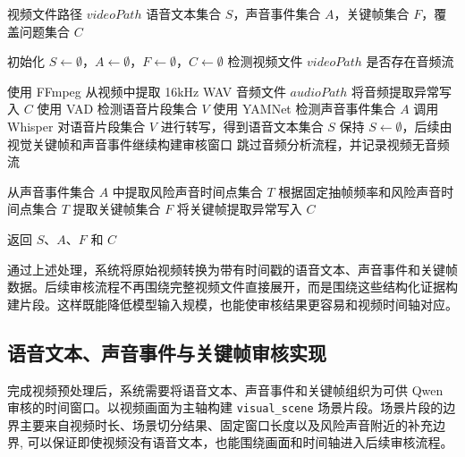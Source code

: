 \begin{algorithm}[!htbp]
    \caption{视频预处理与音频提取实现算法}
    \label{alg:video-preprocess-impl}
    \begin{algorithmic}[1]
        \Require 视频文件路径 $videoPath$
        \Ensure 语音文本集合 $S$，声音事件集合 $A$，关键帧集合 $F$，覆盖问题集合 $C$

        \State 初始化 $S \leftarrow \emptyset$，$A \leftarrow \emptyset$，$F \leftarrow \emptyset$，$C \leftarrow \emptyset$
        \State 检测视频文件 $videoPath$ 是否存在音频流

            \State 使用 FFmpeg 从视频中提取 16kHz WAV 音频文件 $audioPath$
                \State 将音频提取异常写入 $C$
            \Else
                \State 使用 VAD 检测语音片段集合 $V$
                \State 使用 YAMNet 检测声音事件集合 $A$
                    \State 调用 Whisper 对语音片段集合 $V$ 进行转写，得到语音文本集合 $S$
                \Else
                    \State 保持 $S \leftarrow \emptyset$，后续由视觉关键帧和声音事件继续构建审核窗口
                \EndIf
            \EndIf
        \Else
            \State 跳过音频分析流程，并记录视频无音频流
        \EndIf

        \State 从声音事件集合 $A$ 中提取风险声音时间点集合 $T$
        \State 根据固定抽帧频率和风险声音时间点集合 $T$ 提取关键帧集合 $F$
            \State 将关键帧提取异常写入 $C$
        \EndIf

        \State 返回 $S$、$A$、$F$ 和 $C$
    \end{algorithmic}
\end{algorithm}

通过上述处理，系统将原始视频转换为带有时间戳的语音文本、声音事件和关键帧数据。后续审核流程不再围绕完整视频文件直接展开，而是围绕这些结构化证据构建片段。这样既能降低模型输入规模，也能使审核结果更容易和视频时间轴对应。

\subsection{语音文本、声音事件与关键帧审核实现}

完成视频预处理后，系统需要将语音文本、声音事件和关键帧组织为可供 Qwen 审核的时间窗口。以视频画面为主轴构建 \texttt{visual\_scene} 场景片段。场景片段的边界主要来自视频时长、场景切分结果、固定窗口长度以及风险声音附近的补充边界, 可以保证即使视频没有语音文本，也能围绕画面和时间轴进入后续审核流程。

